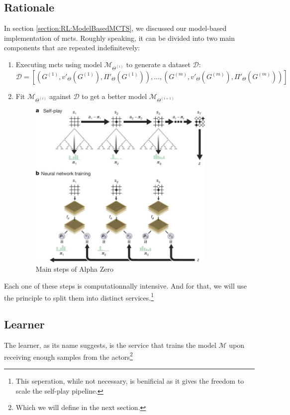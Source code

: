 \subsection{Rationale}
In section \ref{section:RL:ModelBasedMCTS}, we discussed our model-based implementation of \acrshort{mcts}. Roughly speaking, it can be divided into two main components that are repeated indefinitevely:
\begin{enumerate}
	\item Executing \acrshort{mcts} using model $\mathcal{M}_{\Theta^{(i)}}$ to generate a dataset $\mathcal{D}$: $$
	\mathscr{D}=\left[\left(G^{(1)},v'_{\Theta}(G^{(1)}),\Pi'_{\Theta}(G^{(1)})\right), \dots,\left(G^{(m)},v'_{\Theta}(G^{(m)}),\Pi'_{\Theta}(G^{(m)})\right)\right]
	$$
	\item Fit $\mathcal{M}_{\Theta^{(i)}}$ against $\mathscr{D}$ to get a better model $\mathcal{M}_{\Theta^{(i+1)}}$
\begin{figure}[ht]
	\centering
	\includegraphics[width=0.85\textwidth]{Figures/AlphaZero.jpg}
	\caption{Main steps of Alpha Zero}
\end{figure}
\end{enumerate}

Each one of these steps is computationnally intensive. And for that, we will use the  principle to split them into distinct services.\footnote{This seperation, while not necessary, is benificial as it gives the freedom to scale the self-play pipeline.}
\subsection{Learner}
The learner, as its name suggests, is the service that trains the model $\mathcal{M}$ upon receiving enough samples from the actors\footnote{Which we will define in the next section.}

